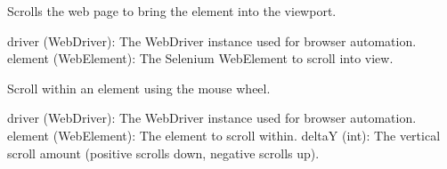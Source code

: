 \documentclass[letterpaper,10pt,english]{sphinxmanual}
\begin{document}

\begin{fulllineitems}
\label{\detokenize{utils:utils.file_management.scroll_element_into_view}}
\pysigstartsignatures
{}
\pysigstopsignatures
\sphinxAtStartPar
Scrolls the web page to bring the element into the viewport.
\begin{description}
\sphinxAtStartPar
driver (WebDriver): The WebDriver instance used for browser automation.
element (WebElement): The Selenium WebElement to scroll into view.

\end{description}

\end{fulllineitems}


\begin{fulllineitems}
\label{\detokenize{utils:utils.file_management.scroll_to_bottom_dynamic}}
\pysigstartsignatures
{}
\pysigstopsignatures
\end{fulllineitems}


\begin{fulllineitems}
\label{\detokenize{utils:utils.file_management.scroll_with_mouse_wheel}}
\pysigstartsignatures
{}
\pysigstopsignatures
\sphinxAtStartPar
Scroll within an element using the mouse wheel.
\begin{description}
\sphinxAtStartPar
driver (WebDriver): The WebDriver instance used for browser automation.
element (WebElement): The element to scroll within.
deltaY (int): The vertical scroll amount (positive scrolls down, negative scrolls up).

\end{description}

\end{fulllineitems}
\end{document}
